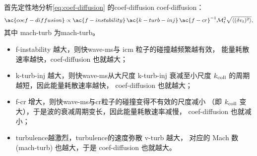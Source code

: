 首先定性地分析\autoref{eq:coef-diffusion}
的\acl{coef-diffusion} \ac{coef-diffusion}：
\begin{equation}
  \ac{coef-diffusion} \propto
    \ac{f-instability} \,\ac{k-turb-inj} \,\ac{f-cr}^{-1}
    \mathcal{M}_t^3 \sqrt{\langle (\delta v_t)^2 \rangle} ,
\end{equation}
其中 \ac{mach-turb} 为\acl{mach-turb}。
\begin{itemize}
  \item \ac{f-instability} 越大，则快\ac{wave-ms}与 \ac{icm} 粒子的碰撞越频繁越有效，
    能量耗散速率越快，\ac{coef-diffusion} 也就越大；
  \item \ac{k-turb-inj} 越大，则快\ac{wave-ms}从大尺度 \ac{k-turb-inj}
    衰减至小尺度 $k_{\mathrm{coll}}$ 的周期越短，因此能量耗散速率越快，
    \ac{coef-diffusion} 也就越大；
  \item \ac{f-cr} 增大，则快\ac{wave-ms}与\ac{cr}粒子的碰撞变得不有效的尺度减小
    （即 $k_{\mathrm{coll}}$ 变大），于是波的衰减周期变长，因此能量耗散速率减慢，
    \ac{coef-diffusion} 也就减小；
  \item \ac{turbulence}越激烈，\ac{turbulence}的速度弥散 \ac{v-turb} 越大，
    对应的 Mach 数 (\ac{mach-turb}) 也越大，于是 \ac{coef-diffusion} 也就越大。
\end{itemize}

